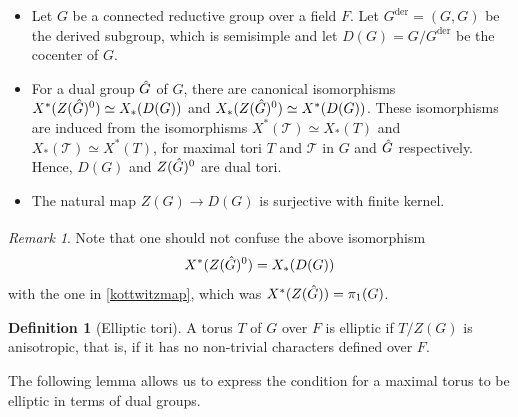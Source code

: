 \documentclass[11pt,a4paper]{article}
\theoremstyle{definition}
\newtheorem{D}[shared]{Definition}
\theoremstyle{plain}
\theoremstyle{remark}
\newtheorem{R}[shared]{Remark}
\theoremstyle{plain}
\begin{document}
\begin{itemize}
    \item Let $G$ be a connected reductive group over a field $F$. Let $G^{\text{der}} = (G,G)$ be the derived subgroup, which is semisimple and let $D(G) = G / G^{\text{der}}$ be the cocenter of $G$.
    \item For a dual group $\Hat{G}$ of $G$, there are canonical isomorphisms $X^*(Z(\Hat{G})^0) \simeq X_*(D(G))$ and $X_*(Z(\Hat{G})^0) \simeq X^*(D(G)) $. These isomorphisms are induced from the isomorphisms $X^*(\mathscr{T}) \simeq X_*(T)$ and $X_*(\mathscr{T}) \simeq X^*(T)$, for maximal tori $T$ and $\mathscr{T}$ in $G$ and $\Hat{G}$ respectively. Hence, $D(G)$ and $Z(\Hat{G})^0$ are dual tori.
    \item The natural map $Z(G) \xrightarrow[]{} D(G)$ is surjective with finite kernel.
\end{itemize}

\begin{R}
    Note that one should not confuse the above isomorphism
    $$X^*(Z(\Hat{G})^0) = X_*(D(G))$$
    with the one in \ref{kottwitzmap}, which was $X^*(Z(\Hat{G})) = \pi_1(G)$.
\end{R}

\begin{D}[Elliptic tori]
    A torus $T$ of $G$ over $F$ is elliptic if $T/Z(G)$ is anisotropic, that is, if it has no non-trivial characters defined over $F$.
\end{D}

The following lemma allows us to express the condition for a maximal torus to be elliptic in terms of dual groups.
\end{document}
